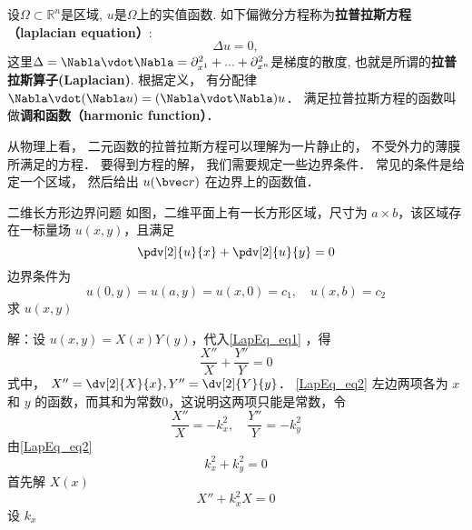 
\begin{issues}
\issueDraft
\end{issues}


设$\Omega\subset\mathbb{R}^n$是区域, $u$是$\Omega$上的实值函数. 如下偏微分方程称为\textbf{拉普拉斯方程（laplacian equation）}:
\begin{equation}
\Delta u = 0,
\end{equation}
这里$\Delta=\Nabla\vdot\Nabla=\partial_{x^1}^2+...+\partial_{x^n}^2$是梯度的散度, 也就是所谓的\textbf{拉普拉斯算子(Laplacian)}. 根据定义， 有分配律 $\Nabla \vdot (\Nabla u) = (\Nabla \vdot \Nabla) u$． 满足拉普拉斯方程的函数叫做\textbf{调和函数（harmonic function）}．

从物理上看， 二元函数的拉普拉斯方程可以理解为一片静止的， 不受外力的薄膜所满足的方程． 要得到方程的解， 我们需要规定一些边界条件． 常见的条件是给定一个区域， 然后给出 $u(\bvec r)$ 在边界上的函数值．

\begin{example}{二维长方形边界问题}
如图，二维平面上有一长方形区域，尺寸为 $a\times b$，该区域存在一标量场 $u(x,y)$，且满足
\begin{equation}\label{LapEq_eq1}
\pdv[2]{u}{x}+\pdv[2]{u}{y}=0
\end{equation}
边界条件为
\begin{equation}
u(0,y)=u(a,y)=u(x,0)=c_1,\quad u(x,b)=c_2
\end{equation}
求 $u(x,y)$
\end{example}

解：设 $u(x,y)=X(x)Y(y)$，代入\autoref{LapEq_eq1} ，得
\begin{equation}\label{LapEq_eq2}
\frac{X''}{X}+\frac{Y''}{Y}=0
\end{equation}
式中， $X''=\dv[2]{X}{x},Y''=\dv[2]{Y}{y}$．
\autoref{LapEq_eq2} 左边两项各为 $x$ 和 $y$ 的函数，而其和为常数0，这说明这两项只能是常数，令
\begin{equation}
\frac{X''}{X}=-k_x^2,\quad \frac{Y''}{Y}=-k_y^2
\end{equation}
由\autoref{LapEq_eq2} 
\begin{equation}
k_x^2+k_y^2=0
\end{equation}
首先解 $X(x)$
\begin{equation}
X''+k_x^2X=0
\end{equation}
设 $k_x$